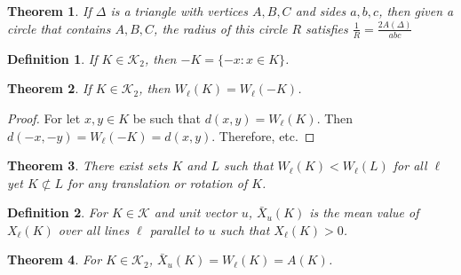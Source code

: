 \documentclass[crop=false,class=book]{standalone}
\theoremstyle{mystyle}
\newtheorem{theorem}{Theorem}[section]
\newtheorem{definition}{Definition}[section]
\begin{document}
\begin{theorem}
If $\Delta$ is a triangle with vertices $A,B,C$ and sides $a,b,c$, then given a circle that contains $A,B,C$, the radius of this circle $R$ satisfies $\frac{1}{R} =\frac{2A(\Delta)}{abc}$
\end{theorem}
\begin{definition}
If $K\in \mathscr{K}_2$, then $-K = \{-x:x\in K\}$.
\end{definition}
\begin{theorem}
If $K\in \mathscr{K}_2$, then $W_{\ell}(K) = W_{\ell}(-K)$.
\end{theorem}
\begin{proof}
For let $x,y\in K$ be such that $d(x,y) = W_{\ell}(K)$. Then $d(-x,-y) = W_{\ell}(-K) = d(x,y)$. Therefore, etc.
\end{proof}
\begin{theorem}
There exist sets $K$ and $L$ such that $W_{\ell}(K)<W_{\ell}(L)$ for all $\ell$ yet $K\not\subset L$ for any translation or rotation of $K$.
\end{theorem}
\begin{definition}
For $K\in \mathscr{K}$ and unit vector $u$, $\bar{X}_{u}(K)$ is the mean value of $X_{\ell}(K)$ over all lines $\ell$ parallel to $u$ such that $X_{\ell}(K)>0$.
\end{definition}
\begin{theorem}
For $K\in \mathscr{K}_2$, $\bar{X}_{u}(K) = W_{\ell}(K)=A(K)$.
\end{theorem}
\end{document}
